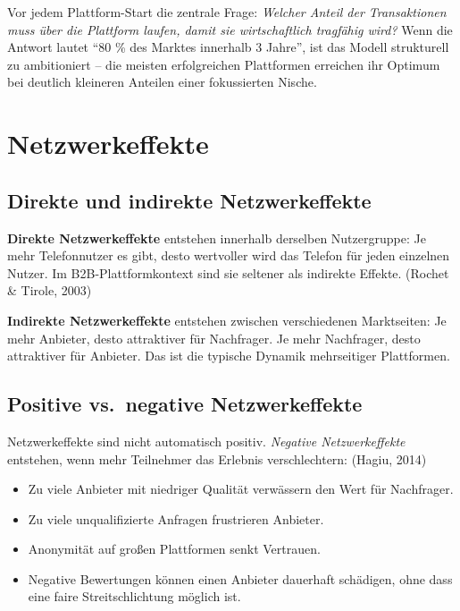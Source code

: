\documentclass[11pt,a4paper,oneside]{article}
\newcommand{\fachbegriff}[1]{\textbf{#1}}
\newcommand{\quelle}[1]{{\footnotesize\color{lpGray}(#1)}}
\begin{document}
\begin{merkbox}
Vor jedem Plattform-Start die zentrale Frage: \emph{Welcher Anteil der Transaktionen muss über die Plattform laufen, damit sie wirtschaftlich tragfähig wird?} Wenn die Antwort lautet ``80 \% des Marktes innerhalb 3 Jahre'', ist das Modell strukturell zu ambitioniert -- die meisten erfolgreichen Plattformen erreichen ihr Optimum bei deutlich kleineren Anteilen einer fokussierten Nische.
\end{merkbox}

\section{Netzwerkeffekte}

\subsection{Direkte und indirekte Netzwerkeffekte}

\fachbegriff{Direkte Netzwerkeffekte} entstehen innerhalb derselben Nutzergruppe: Je mehr Telefonnutzer es gibt, desto wertvoller wird das Telefon für jeden einzelnen Nutzer. Im B2B-Plattformkontext sind sie seltener als indirekte Effekte. \quelle{Rochet \& Tirole, 2003}

\fachbegriff{Indirekte Netzwerkeffekte} entstehen zwischen verschiedenen Marktseiten: Je mehr Anbieter, desto attraktiver für Nachfrager. Je mehr Nachfrager, desto attraktiver für Anbieter. Das ist die typische Dynamik mehrseitiger Plattformen.

\subsection{Positive vs.\ negative Netzwerkeffekte}

Netzwerkeffekte sind nicht automatisch positiv. \emph{Negative Netzwerkeffekte} entstehen, wenn mehr Teilnehmer das Erlebnis verschlechtern: \quelle{Hagiu, 2014}

\begin{itemize}
  \item Zu viele Anbieter mit niedriger Qualität verwässern den Wert für Nachfrager.
  \item Zu viele unqualifizierte Anfragen frustrieren Anbieter.
  \item Anonymität auf großen Plattformen senkt Vertrauen.
  \item Negative Bewertungen können einen Anbieter dauerhaft schädigen, ohne dass eine faire Streitschlichtung möglich ist.
\end{itemize}
\end{document}
